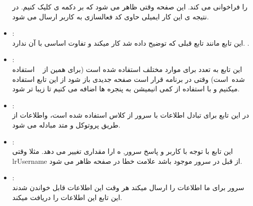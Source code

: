 \documentclass[12pt,onecolumn,a4paper]{article}
\begin{document}
\begin{itemize}
 را فراخوانی می کند.
این صفحه وقتی ظاهر می شود که بر دکمه ی
 کلیک کنیم. در نتیجه ی این کار ایمیلی حاوی کد فعالسازی به کاربر ارسال می شود.\\
\item {}:
\\
این تابع مانند تابع قبلی که توضیح داده شد کار میکند و تفاوت اساسی با آن ندارد.
.
\item {} :
\\
این تابع به تعدد برای موارد مختلف استفاده شده است (برای همین از 
 \lr{\#}
استفاده شده است) وقتی در برنامه قرار است صفحه جدیدی باز شود از این تابع استفاده میکنیم و با استفاده از
 کمی انیمیشن به پنجره ها اضافه می کنیم تا زیبا تر شود.
\item {}:
\\
در این تابع برای تبادل اطلاعات با سرور از کلاس 
 استفاده شده است، واطلاعات از طریق پروتوکل
 و متد
مبادله می شود.
\\
\item {} :
\\
 این تابع با توجه با
کاربر و پاسخ سرور, 
 ه ارا مقداری تغییر می دهد. مثلا وقتی
 lr{Username}
  از قبل در سرور موجود باشد علامت خطا در صفحه ظاهر می شود.
\item {} :
\\
سرور برای ما اطلاعات را ارسال میکند هر وقت این اطلاعات قابل خواندن شدند این تابع این اطلاعات را دریافت میکند.\\
\end{itemize}
\end{document}
